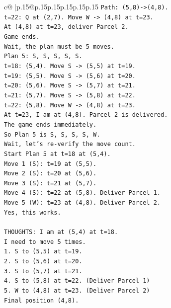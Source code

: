 \documentclass{article}
\begin{document}
{\begin{supertabular}{c@{$\;$}|p{.15\linewidth}@{}p{.15\linewidth}p{.15\linewidth}p{.15\linewidth}p{.15\linewidth}p{.15\linewidth}}
{{{\texttt{Path: (5,8){-}>(4,8).} \\
\texttt{t=22: Q at (2,7). Move W {-}> (4,8) at t=23.} \\
\texttt{At (4,8) at t=23, deliver Parcel 2.} \\
\texttt{Game ends.} \\
\texttt{Wait, the plan must be 5 moves.} \\
\texttt{Plan 5: S, S, S, S, S.} \\
\texttt{t=18: (5,4). Move S {-}> (5,5) at t=19.} \\
\texttt{t=19: (5,5). Move S {-}> (5,6) at t=20.} \\
\texttt{t=20: (5,6). Move S {-}> (5,7) at t=21.} \\
\texttt{t=21: (5,7). Move S {-}> (5,8) at t=22.} \\
\texttt{t=22: (5,8). Move W {-}> (4,8) at t=23.} \\
\texttt{At t=23, I am at (4,8). Parcel 2 is delivered.} \\
\texttt{The game ends immediately.} \\
\texttt{So Plan 5 is S, S, S, S, W.} \\
\texttt{Wait, let's re{-}verify the move count.} \\
\texttt{Start Plan 5 at t=18 at (5,4).} \\
\texttt{Move 1 (S): t=19 at (5,5).} \\
\texttt{Move 2 (S): t=20 at (5,6).} \\
\texttt{Move 3 (S): t=21 at (5,7).} \\
\texttt{Move 4 (S): t=22 at (5,8). Deliver Parcel 1.} \\
\texttt{Move 5 (W): t=23 at (4,8). Deliver Parcel 2.} \\
\texttt{Yes, this works.} \\
\\ 
\texttt{THOUGHTS: I am at (5,4) at t=18.} \\
\texttt{I need to move 5 times.} \\
\texttt{1. S to (5,5) at t=19.} \\
\texttt{2. S to (5,6) at t=20.} \\
\texttt{3. S to (5,7) at t=21.} \\
\texttt{4. S to (5,8) at t=22. (Deliver Parcel 1)} \\
\texttt{5. W to (4,8) at t=23. (Deliver Parcel 2)} \\
\texttt{Final position (4,8).} \\
\\ 
}}}
\end{supertabular}}
\end{document}

